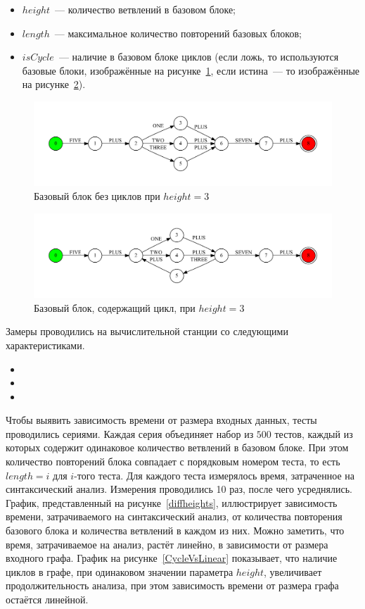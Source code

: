 \begin{itemize}
  \item $height$~--- количество ветвлений в базовом блоке;
  \item $length$~--- максимальное количество повторений базовых блоков;
  \item $isCycle$~--- наличие в базовом блоке циклов (если ложь, то используются базовые блоки, изображённые на рисунке~\ref{block}, если истина~--- то изображённые на рисунке~\ref{block_loop}).
\end{itemize}

\begin{figure}[h!]
 \centering
 \includegraphics[width=15cm]{pics/block.pdf}
 \caption{Базовый блок без циклов при $height=3$}
 \label{block}
\end{figure}

\begin{figure}[h!]
 \centering
 \includegraphics[width=15cm]{pics/block_loop.pdf}
 \caption{Базовый блок, содержащий цикл, при $height=3$}
 \label{block_loop}
\end{figure}

Замеры проводились на вычислительной станции со следующими характеристиками.
\begin{itemize}
\item
\item 
\item 
\end{itemize}

Чтобы выявить зависимость времени от размера входных данных, тесты проводились сериями. Каждая серия объединяет набор из $500$ тестов, каждый из которых содержит одинаковое количество ветвлений в базовом блоке. При этом количество повторений блока совпадает с порядковым номером теста, то есть $length=i$ для $i$-того теста. Для каждого теста измерялось время, затраченное на синтаксический анализ. Измерения проводились 10 раз, после чего усреднялись. График, представленный на рисунке~\ref{diffheights}, иллюстрирует зависимость времени, затрачиваемого на синтаксический анализ, от количества повторения базового блока и количества ветвлений в каждом из них. Можно заметить, что время, затрачиваемое на анализ, растёт линейно, в зависимости от размера входного графа. График на рисунке~\ref{CycleVsLinear} показывает, что наличие циклов в графе, при одинаковом значении параметра $height$, увеличивает продолжительность анализа, при этом зависимость времени от размера графа остаётся линейной.

